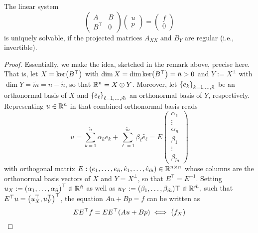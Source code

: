 \begin{theorem}
	The linear system
	\[
		\begin{pmatrix}
			A & B\\
			B^\top & 0
		\end{pmatrix}\begin{pmatrix}
			u\\
			p
		\end{pmatrix} = \begin{pmatrix}
			f\\
			0
		\end{pmatrix}
	\]
	is uniquely solvable, if the projected matrices \(A_{XX}\) and \(B_Y\) are regular (i.e., invertible).
\end{theorem}

\begin{proof}
	Essentially, we make the idea, sketched in the remark above, precise here.
	That is, let \(X = \ker\parentheses*{B^\top}\) with \(\dim X = \dim \ker\parentheses*{B^\top} = \tilde{n} > 0\) and \(Y := X^\bot\) with \(\dim Y = \tilde{m} = n - \tilde{n}\), so that \(\R^n = X \oplus Y\).
	Moreover, let \(\braces*{e_k}_{k = 1, \ldots, \tilde{n}}\) be an orthonormal basis of \(X\) and \(\braces*{\hat{e}_\ell}_{\ell = 1, \ldots, \tilde{m}}\) an orthonormal basis of \(Y\), respectively.
	Representing \(u \in \R^n\) in that combined orthonormal basis reads
	\[
		u = \sum_{k = 1}^{\tilde{n}}\alpha_k e_k + \sum_{\ell = 1}^{\tilde{m}}\beta_\ell \hat{e}_\ell = E\begin{pmatrix}
			\alpha_1\\
			\vdots\\
			\alpha_{\tilde{n}}\\
			\beta_1\\
			\vdots\\
			\beta_{\tilde{m}}
		\end{pmatrix}
	\]
	with orthogonal matrix \(E: \parentheses*{e_1, \ldots, e_{\tilde{n}}, \hat{e}_1, \ldots, \hat{e}_{\tilde{m}}} \in \R^{n \times n}\) whose columns are the orthonormal basis vectors of \(X\) and \(Y = X^\bot\), so that \(E^\top = E^{-1}\).
	Setting \(u_X := \parentheses*{\alpha_1, \ldots, \alpha_{\tilde{n}}}^\top \in \R^{\tilde{n}}\) as well as \(u_Y := \parentheses*{\beta_1, \ldots, \beta_{\tilde{m}}} \top \in \R^{\tilde{m}}\), such that \(E^\top u = \parentheses*{u_X^\top, u_Y^\top}^\top\), the equation \(Au + Bp = f\) can be written as
	\[
		EE^\top f = EE^\top \parentheses*{Au + Bp} \iff \begin{pmatrix}
			f_X\\

\end{pmatrix}\]
\end{proof}
